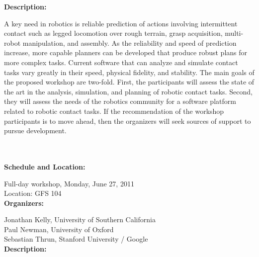{{\bf Description: }

A key need in robotics is reliable prediction of actions involving intermittent contact such as legged locomotion over rough terrain, grasp acquisition, multi-robot manipulation, and assembly. As the reliability and speed of prediction increase, more capable planners can be developed that produce robust plans for more complex tasks. Current software that can analyze and simulate contact tasks vary greatly in their speed, physical fidelity, and stability. The main goals of the proposed workshop are two-fold. First, the participants will assess the state of the art in the analysis, simulation, and planning of robotic contact tasks. Second, they will assess the needs of the robotics community for a software platform related to robotic contact tasks. If the recommendation of the workshop participants is to move ahead, then the organizers will seek sources of support to pursue development.



\\[5mm]



\\[5mm]

{\bf  Schedule and Location:}

Full-day workshop, Monday, June 27, 2011\\
Location: GFS 104 \\[4mm]

{\bf  Organizers:}

Jonathan Kelly, University of Southern California\\
Paul Newman, University of Oxford\\
Sebastian Thrun, Stanford University / Google\\[4mm]


{\bf Description: }

}
